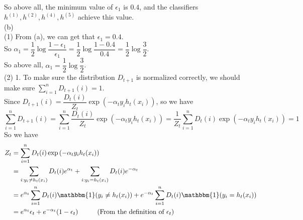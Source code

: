\documentclass[10pt]{article}
\begin{document}
\begin{enumerate}[1.]
So above all, the minimum value of $\epsilon_1$ is $0.4$, and the classifiers $h^{(1)}, h^{(2)}, h^{(4)}, h^{(5)}$ achieve this value.\\

(b)\\
(1) From (a), we can get that $\epsilon_1=0.4$.\\
So $\alpha_1=\dfrac{1}{2}\log\dfrac{1-\epsilon_1}{\epsilon_1}=\dfrac{1}{2}\log\dfrac{1-0.4}{0.4}=\dfrac{1}{2}\log\dfrac{3}{2}$.\\

So above all, $\alpha_1=\dfrac{1}{2}\log\dfrac{3}{2}$.\\

(2) 1. To make sure the distribution $D_{t+1}$ is normalized correctly, we should make sure $\sum\limits_{i=1}^{n} D_{t+1}(i) = 1$.\\
Since $D_{t+1}(i)=\dfrac{D_{t}(i)}{Z_t}\exp\left(-\alpha_ty_ih_t(x_i)\right)$, so we have
$$\sum_{i=1}^{n} D_{t+1}(i)=\sum_{i=1}^{n}\dfrac{D_{t}(i)}{Z_t}\exp\left(-\alpha_ty_ih_t(x_i)\right)=\dfrac{1}{Z_t}\sum_{i=1}^{n}D_{t}(i)\exp(-\alpha_ty_ih_t(x_i))=1$$
So we have
\begin{equation}
\begin{aligned}
    Z_t&=\sum_{i=1}^{n}D_{t}(i)\exp\left(-\alpha_ty_ih_t(x_i)\right)\\
    &=\sum_{i:y_i\neq h_t(x_i)}D_{t}(i)e^{\alpha_t}+\sum_{i:y_i=h_t(x_i)}D_{t}(i)e^{-\alpha_t}\\
    &=e^{\alpha_t}\sum_{i=1}^{n}D_{t}(i)\mathbbm{1}(y_{i} \neq h_{t}(x_{i}))+e^{-\alpha_t}\sum_{i=1}^{n}D_{t}(i)\mathbbm{1}(y_{i} = h_{t}(x_{i}))\\
    &=e^{\alpha_t}\epsilon_t+e^{-\alpha_t}(1-\epsilon_t) \hspace{1cm} \text{(From the definition of $\epsilon_t$)}\\
\end{aligned}
\end{equation}







\end{enumerate}
\end{document}
